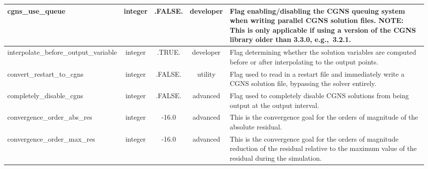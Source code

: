 \documentclass[letterpaper,10pt]{article}
\newcommand{\sladv}{advanced}
\newcommand{\sldev}{developer}
\newcommand{\slutl}{utility}
\newcommand{\typflt}{integer}
\newcommand{\typlog}{integer}
\newcommand{\tru}{.TRUE.}
\newcommand{\fls}{.FALSE.}
\newcommand{\minorline}{\hline}
\newcommand{\groupline}[1]{}
\newlength{\colEwidth}
\newcommand{\descriptionbegin}{}
\newcommand{\descriptionend}{\\ \minorline}
\newcommand{\forexample}{e.g.,~}
\newcommand{\NOTE}{\newline \textcolor{OrangeRed3}{\textbf{NOTE: }}}
\begin{document}
\begin{longtable}{ | l | c | c | c | p{\colEwidth} | }
    \groupline{CGNS OUTPUT OPTIONS}
    cgns\_use\_queue                      & \typlog & \fls & \sldev &
    \descriptionbegin
    Flag enabling/disabling the CGNS queuing system when writing parallel CGNS
    solution files. \NOTE This is only applicable if using a version of
    the CGNS library older than 3.3.0, \forexample 3.2.1.
    \descriptionend
    interpolate\_before\_output\_variable & \typlog & \tru & \sldev &
    \descriptionbegin
    Flag determining whether the solution variables are computed before or after
    interpolating to the output points.
    \descriptionend
    convert\_restart\_to\_cgns            & \typlog & \fls & \slutl &
    \descriptionbegin
    Flag used to read in a restart file and immediately write a CGNS solution
    file, bypassing the solver entirely.
    \descriptionend
    completely\_disable\_cgns             & \typlog & \fls & \sladv &
    \descriptionbegin
    Flag used to completely disable CGNS solutions from being output at the
    output interval.
    \descriptionend

    \groupline{CONVERGENCE CRITERIA}
    convergence\_order\_abs\_res & \typflt & -16.0 & \sladv &
    \descriptionbegin
    This is the convergence goal for the orders of magnitude of the absolute
    residual.
    \descriptionend
    convergence\_order\_max\_res & \typflt & -16.0 & \sladv &
    \descriptionbegin
    This is the convergence goal for the orders of magnitude reduction of the
    residual relative to the maximum value of the residual during the
    simulation.
    \descriptionend


\end{longtable}
\end{document}
